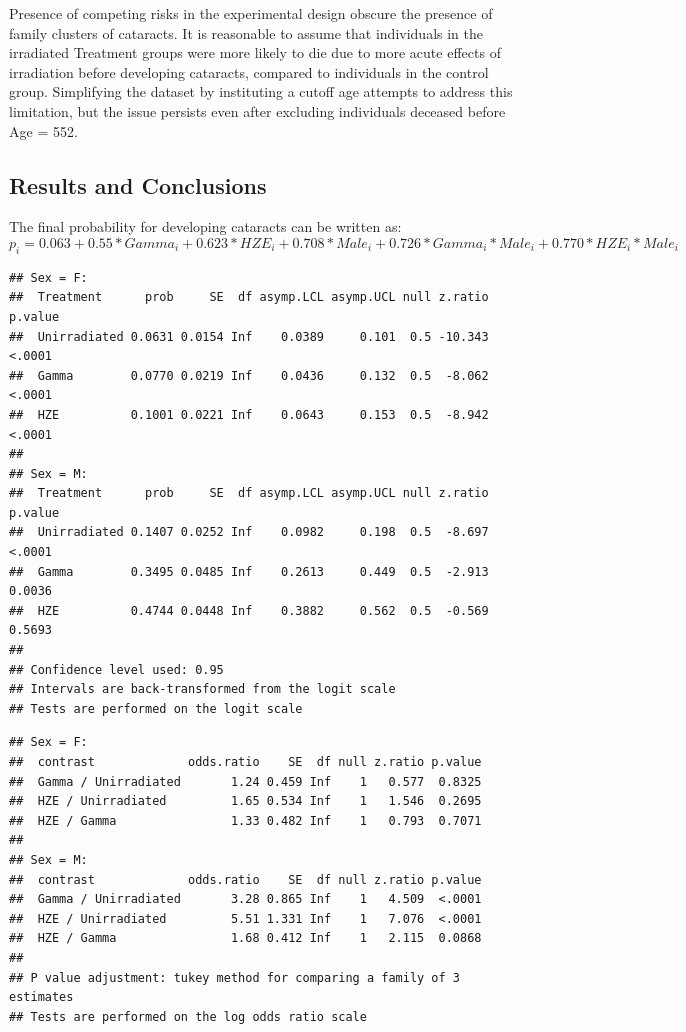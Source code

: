 \documentclass[
]{article}
\begin{document}
Presence of competing risks in the experimental design obscure the
presence of family clusters of cataracts. It is reasonable to assume
that individuals in the irradiated Treatment groups were more likely to
die due to more acute effects of irradiation before developing
cataracts, compared to individuals in the control group. Simplifying the
dataset by instituting a cutoff age attempts to address this limitation,
but the issue persists even after excluding individuals deceased before
Age = 552.

\hypertarget{results-and-conclusions}{%
\subsection{Results and Conclusions}\label{results-and-conclusions}}

The final probability for developing cataracts can be written as:\\
\[
p_i = 0.063 + 0.55*Gamma_i + 0.623*HZE_i + 0.708*Male_i + 0.726*Gamma_i*Male_i + 0.770*HZE_i*Male_i
\]

\begin{verbatim}
## Sex = F:
##  Treatment      prob     SE  df asymp.LCL asymp.UCL null z.ratio p.value
##  Unirradiated 0.0631 0.0154 Inf    0.0389     0.101  0.5 -10.343  <.0001
##  Gamma        0.0770 0.0219 Inf    0.0436     0.132  0.5  -8.062  <.0001
##  HZE          0.1001 0.0221 Inf    0.0643     0.153  0.5  -8.942  <.0001
## 
## Sex = M:
##  Treatment      prob     SE  df asymp.LCL asymp.UCL null z.ratio p.value
##  Unirradiated 0.1407 0.0252 Inf    0.0982     0.198  0.5  -8.697  <.0001
##  Gamma        0.3495 0.0485 Inf    0.2613     0.449  0.5  -2.913  0.0036
##  HZE          0.4744 0.0448 Inf    0.3882     0.562  0.5  -0.569  0.5693
## 
## Confidence level used: 0.95 
## Intervals are back-transformed from the logit scale 
## Tests are performed on the logit scale
\end{verbatim}

\begin{verbatim}
## Sex = F:
##  contrast             odds.ratio    SE  df null z.ratio p.value
##  Gamma / Unirradiated       1.24 0.459 Inf    1   0.577  0.8325
##  HZE / Unirradiated         1.65 0.534 Inf    1   1.546  0.2695
##  HZE / Gamma                1.33 0.482 Inf    1   0.793  0.7071
## 
## Sex = M:
##  contrast             odds.ratio    SE  df null z.ratio p.value
##  Gamma / Unirradiated       3.28 0.865 Inf    1   4.509  <.0001
##  HZE / Unirradiated         5.51 1.331 Inf    1   7.076  <.0001
##  HZE / Gamma                1.68 0.412 Inf    1   2.115  0.0868
## 
## P value adjustment: tukey method for comparing a family of 3 estimates 
## Tests are performed on the log odds ratio scale
\end{verbatim}
\end{document}
